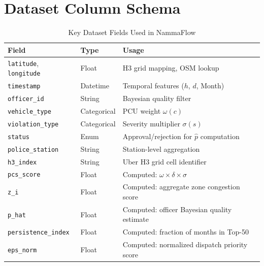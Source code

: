 \documentclass[12pt,a4paper]{article}
\begin{document}
\section{Dataset Column Schema}

\begin{table}[H]
\centering
\caption{Key Dataset Fields Used in NammaFlow}
\begin{tabular}{lll}
\toprule
\textbf{Field} & \textbf{Type} & \textbf{Usage} \\
\midrule
\texttt{latitude}, \texttt{longitude} & Float & H3 grid mapping, OSM lookup \\
\texttt{timestamp} & Datetime & Temporal features ($h$, $d$, Month) \\
\texttt{officer\_id} & String & Bayesian quality filter \\
\texttt{vehicle\_type} & Categorical & PCU weight $\omega(c)$ \\
\texttt{violation\_type} & Categorical & Severity multiplier $\sigma(s)$ \\
\texttt{status} & Enum & Approval/rejection for $\hat{p}$ computation \\
\texttt{police\_station} & String & Station-level aggregation \\
\texttt{h3\_index} & String & Uber H3 grid cell identifier \\
\texttt{pcs\_score} & Float & Computed: $\omega \times \delta \times \sigma$ \\
\texttt{z\_i} & Float & Computed: aggregate zone congestion score \\
\texttt{p\_hat} & Float & Computed: officer Bayesian quality estimate \\
\texttt{persistence\_index} & Float & Computed: fraction of months in Top-50 \\
\texttt{eps\_norm} & Float & Computed: normalized dispatch priority score \\
\bottomrule
\end{tabular}
\end{table}
\end{document}
